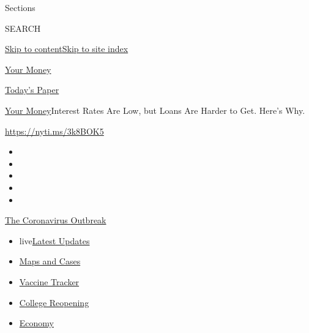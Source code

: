 Sections

SEARCH

\protect\hyperlink{site-content}{Skip to
content}\protect\hyperlink{site-index}{Skip to site index}

\href{https://www.nytimes3xbfgragh.onion/section/your-money}{Your Money}

\href{https://myaccount.nytimes3xbfgragh.onion/auth/login?response_type=cookie\&client_id=vi}{}

\href{https://www.nytimes3xbfgragh.onion/section/todayspaper}{Today's
Paper}

\href{/section/your-money}{Your Money}\textbar{}Interest Rates Are Low,
but Loans Are Harder to Get. Here's Why.

\url{https://nyti.ms/3k8BOK5}

\begin{itemize}
\item
\item
\item
\item
\item
\end{itemize}

\href{https://www.nytimes3xbfgragh.onion/news-event/coronavirus?action=click\&pgtype=Article\&state=default\&region=TOP_BANNER\&context=storylines_menu}{The
Coronavirus Outbreak}

\begin{itemize}
\tightlist
\item
  live\href{https://www.nytimes3xbfgragh.onion/2020/08/04/world/coronavirus-cases.html?action=click\&pgtype=Article\&state=default\&region=TOP_BANNER\&context=storylines_menu}{Latest
  Updates}
\item
  \href{https://www.nytimes3xbfgragh.onion/interactive/2020/us/coronavirus-us-cases.html?action=click\&pgtype=Article\&state=default\&region=TOP_BANNER\&context=storylines_menu}{Maps
  and Cases}
\item
  \href{https://www.nytimes3xbfgragh.onion/interactive/2020/science/coronavirus-vaccine-tracker.html?action=click\&pgtype=Article\&state=default\&region=TOP_BANNER\&context=storylines_menu}{Vaccine
  Tracker}
\item
  \href{https://www.nytimes3xbfgragh.onion/2020/08/02/us/covid-college-reopening.html?action=click\&pgtype=Article\&state=default\&region=TOP_BANNER\&context=storylines_menu}{College
  Reopening}
\item
  \href{https://www.nytimes3xbfgragh.onion/live/2020/08/04/business/stock-market-today-coronavirus?action=click\&pgtype=Article\&state=default\&region=TOP_BANNER\&context=storylines_menu}{Economy}
\end{itemize}

